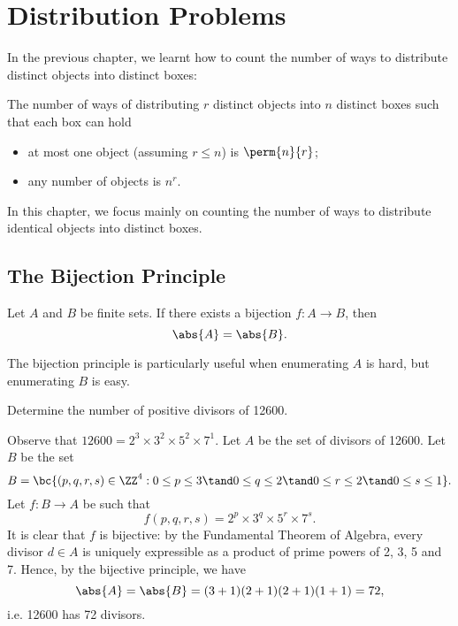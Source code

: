 \chapter{Distribution Problems}

In the previous chapter, we learnt how to count the number of ways to distribute distinct objects into distinct boxes:

\begin{proposition}
    The number of ways of distributing $r$ distinct objects into $n$ distinct boxes such that each box can hold
    \begin{itemize}
        \item at most one object (assuming $r \leq n$) is $\perm{n}{r}$;
        \item any number of objects is $n^r$.
    \end{itemize}
\end{proposition}

In this chapter, we focus mainly on counting the number of ways to distribute identical objects into distinct boxes.

\section{The Bijection Principle}

\begin{theorem}
    Let $A$ and $B$ be finite sets. If there exists a bijection $f: A \to B$, then \[\abs{A} = \abs{B}.\]
\end{theorem}

The bijection principle is particularly useful when enumerating $A$ is hard, but enumerating $B$ is easy.

\begin{sample}
    Determine the number of positive divisors of 12600.
\end{sample}
\begin{sampans}
    Observe that $12600 = 2^3 \times 3^2 \times 5^2 \times 7^1$. Let $A$ be the set of divisors of 12600. Let $B$ be the set \[B = \bc{(p,q,r,s) \in \ZZ^4 : 0 \leq p \leq 3 \tand 0 \leq q \leq 2 \tand 0 \leq r \leq 2 \tand 0 \leq s \leq 1}.\] Let $f : B \to A$ be such that \[f(p,q,r,s) = 2^p \times 3^q \times 5^r \times 7^s.\] It is clear that $f$ is bijective: by the Fundamental Theorem of Algebra, every divisor $d \in A$ is uniquely expressible as a product of prime powers of 2, 3, 5 and 7. Hence, by the bijective principle, we have \[\abs{A} = \abs{B} = (3+1)(2+1)(2+1)(1+1) = 72,\] i.e. 12600 has 72 divisors.
\end{sampans}


